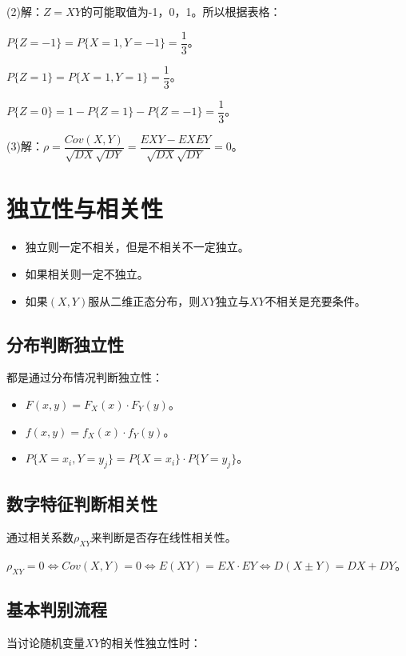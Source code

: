 \documentclass[UTF8, 12pt]{ctexart}
\begin{document}
(2)解：$Z=XY$的可能取值为-1，0，1。所以根据表格：

$P\{Z=-1\}=P\{X=1,Y=-1\}=\dfrac{1}{3}$。

$P\{Z=1\}=P\{X=1,Y=1\}=\dfrac{1}{3}$。

$P\{Z=0\}=1-P\{Z=1\}-P\{Z=-1\}=\dfrac{1}{3}$。

(3)解：$\rho=\dfrac{Cov(X,Y)}{\sqrt{DX}\sqrt{DY}}=\dfrac{EXY-EXEY}{\sqrt{DX}\sqrt{DY}}=0$。

\section{独立性与相关性}

\begin{itemize}
    \item 独立则一定不相关，但是不相关不一定独立。
    \item 如果相关则一定不独立。
    \item 如果$(X,Y)$服从二维正态分布，则$XY$独立与$XY$不相关是充要条件。
\end{itemize}

\subsection{分布判断独立性}

都是通过分布情况判断独立性：

\begin{itemize}
    \item $F(x,y)=F_X(x)\cdot F_Y(y)$。
    \item $f(x,y)=f_X(x)\cdot f_Y(y)$。
    \item $P\{X=x_i,Y=y_j\}=P\{X=x_i\}\cdot P\{Y=y_j\}$。
\end{itemize}

\subsection{数字特征判断相关性}

通过相关系数$\rho_{XY}$来判断是否存在线性相关性。

$\rho_{XY}=0\Leftrightarrow Cov(X,Y)=0\Leftrightarrow E(XY)=EX\cdot EY\Leftrightarrow D(X\pm Y)=DX+DY$。

\subsection{基本判别流程}

当讨论随机变量$XY$的相关性独立性时：
\end{document}
